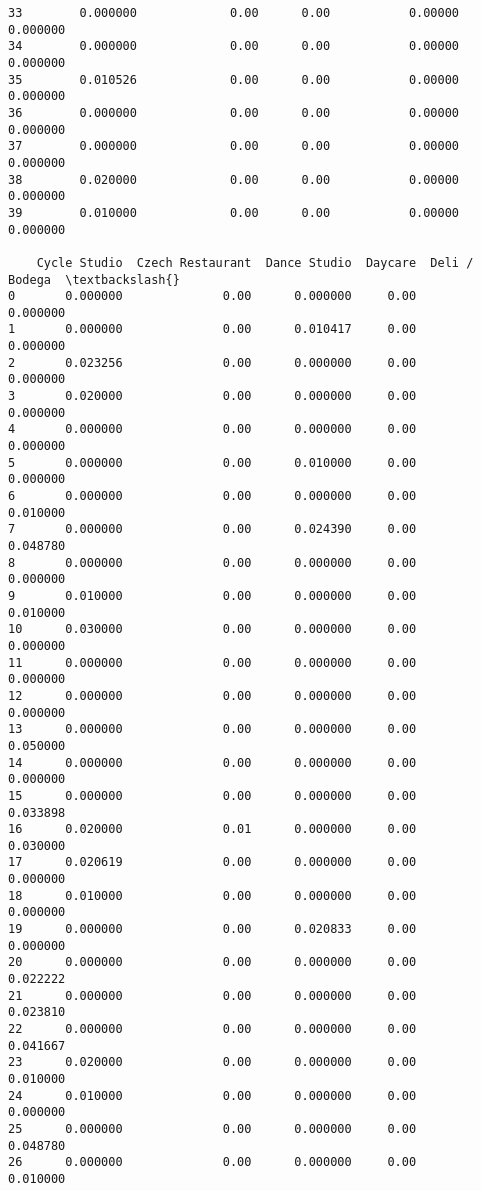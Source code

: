 \documentclass[11pt]{article}
\begin{document}
\begin{tcolorbox}[breakable, size=fbox, boxrule=.5pt, pad at break*=1mm, opacityfill=0]
\begin{Verbatim}[commandchars=\\\{\}]
33        0.000000             0.00      0.00           0.00000      0.000000
34        0.000000             0.00      0.00           0.00000      0.000000
35        0.010526             0.00      0.00           0.00000      0.000000
36        0.000000             0.00      0.00           0.00000      0.000000
37        0.000000             0.00      0.00           0.00000      0.000000
38        0.020000             0.00      0.00           0.00000      0.000000
39        0.010000             0.00      0.00           0.00000      0.000000

    Cycle Studio  Czech Restaurant  Dance Studio  Daycare  Deli / Bodega  \textbackslash{}
0       0.000000              0.00      0.000000     0.00       0.000000
1       0.000000              0.00      0.010417     0.00       0.000000
2       0.023256              0.00      0.000000     0.00       0.000000
3       0.020000              0.00      0.000000     0.00       0.000000
4       0.000000              0.00      0.000000     0.00       0.000000
5       0.000000              0.00      0.010000     0.00       0.000000
6       0.000000              0.00      0.000000     0.00       0.010000
7       0.000000              0.00      0.024390     0.00       0.048780
8       0.000000              0.00      0.000000     0.00       0.000000
9       0.010000              0.00      0.000000     0.00       0.010000
10      0.030000              0.00      0.000000     0.00       0.000000
11      0.000000              0.00      0.000000     0.00       0.000000
12      0.000000              0.00      0.000000     0.00       0.000000
13      0.000000              0.00      0.000000     0.00       0.050000
14      0.000000              0.00      0.000000     0.00       0.000000
15      0.000000              0.00      0.000000     0.00       0.033898
16      0.020000              0.01      0.000000     0.00       0.030000
17      0.020619              0.00      0.000000     0.00       0.000000
18      0.010000              0.00      0.000000     0.00       0.000000
19      0.000000              0.00      0.020833     0.00       0.000000
20      0.000000              0.00      0.000000     0.00       0.022222
21      0.000000              0.00      0.000000     0.00       0.023810
22      0.000000              0.00      0.000000     0.00       0.041667
23      0.020000              0.00      0.000000     0.00       0.010000
24      0.010000              0.00      0.000000     0.00       0.000000
25      0.000000              0.00      0.000000     0.00       0.048780
26      0.000000              0.00      0.000000     0.00       0.010000

\end{Verbatim}
\end{tcolorbox}
\end{document}
